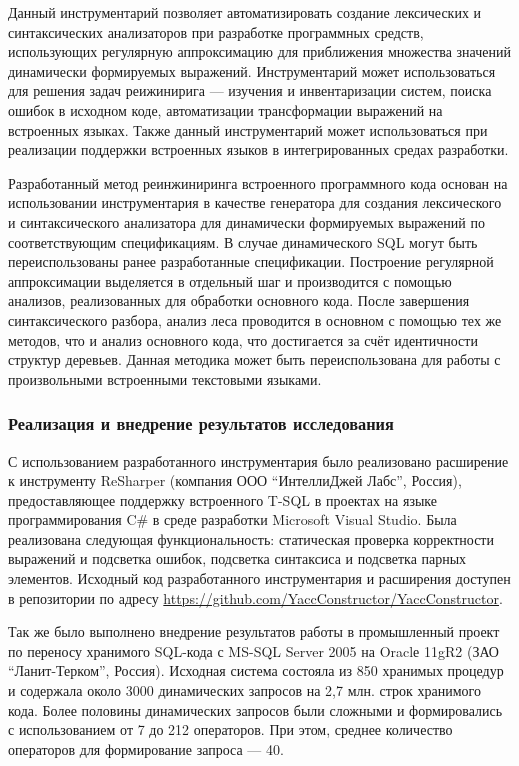 Данный инструментарий позволяет автоматизировать создание лексических и синтаксических анализаторов при разработке программных средств, использующих регулярную аппроксимацию для приближения множества значений динамически формируемых выражений. Инструментарий может использоваться  для решения задач реижинирига --- изучения и инвентаризации систем, поиска ошибок в исходном коде, автоматизации трансформации выражений на встроенных языках. Также данный инструментарий может использоваться при реализации поддержки встроенных языков в интегрированных средах разработки.

Разработанный метод реинжиниринга встроенного программного кода основан на использовании инструментария в качестве генератора для создания лексического и синтаксического анализатора для динамически 
формируемых выражений по соответствующим спецификациям. В случае динамического SQL могут быть переиспользованы ранее разработанные спецификации. Построение регулярной аппроксимации выделяется в отдельный 
шаг и производится с помощью анализов, реализованных для обработки основного кода. После завершения синтаксического разбора, анализ леса проводится в основном с помощью тех же методов, что и анализ 
основного кода, что достигается за счёт идентичности структур деревьев. Данная методика может быть переиспользована для работы с произвольными встроенными текстовыми языками.

\subsubsection*{\large{Реализация и внедрение результатов исследования}}

С использованием разработанного инструментария было реализовано расширение к инструменту ReSharper (компания ООО ``ИнтеллиДжей Лабс'', Россия), предоставляющее поддержку встроенного T-SQL в проектах на языке программирования C\# в среде разработки Microsoft Visual Studio. Была реализована следующая функциональность: статическая проверка корректности выражений и подсветка ошибок, подсветка синтаксиса и подсветка парных элементов. Исходный код разработанного инструментария и расширения доступен в репозитории по адресу \url{https://github.com/YaccConstructor/YaccConstructor}.

Так же было выполнено внедрение результатов работы в промышленный проект по переносу хранимого SQL-кода с MS-SQL Server 2005 на Oraclе 11gR2 (ЗАО ``Ланит-Терком'', Россия). Исходная система состояла из 850 хранимых процедур и содержала около 3000 динамических запросов на 2,7 млн. строк хранимого кода. Более половины динамических запросов были сложными и формировались с использованием от 7 до 212 операторов. При этом, среднее количество операторов для формирование запроса ---  40.


